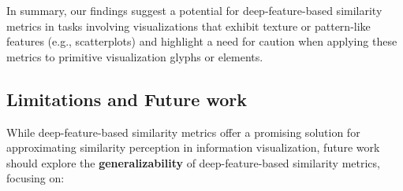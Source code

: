 \documentclass[sigconf]{acmart}
\begin{document}
In summary, our findings suggest a potential for deep-feature-based similarity metrics in tasks involving visualizations that exhibit texture or pattern-like features (e.g., scatterplots) and highlight a need for caution when applying these metrics to primitive visualization glyphs or elements. 

\subsection{Limitations and Future work}

While deep-feature-based similarity metrics offer a promising solution for approximating similarity perception in information visualization, future work should explore the \textbf{generalizability} of deep-feature-based similarity metrics, focusing on:
\end{document}
